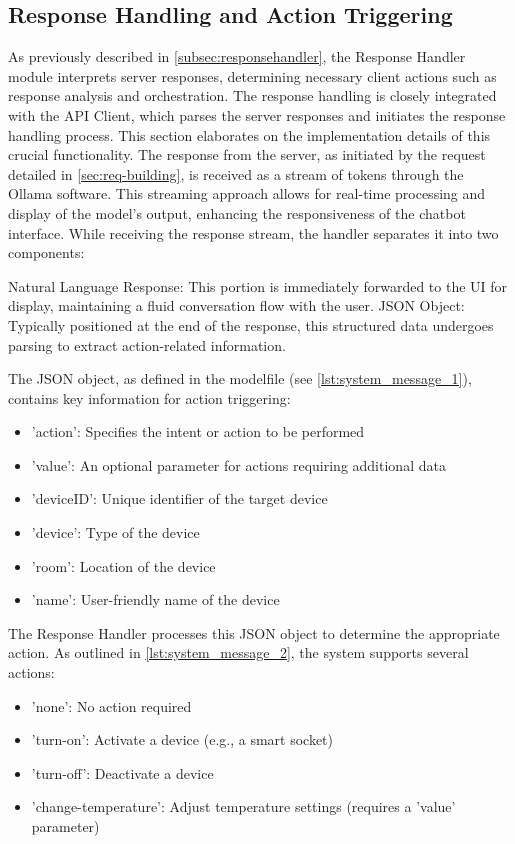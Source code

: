 \subsection{Response Handling and Action Triggering}
As previously described in \cref{subsec:responsehandler}, the Response Handler module interprets server responses, determining necessary client actions such as response analysis and orchestration. The response handling is closely integrated with the API Client, which parses the server responses and initiates the response handling process. This section elaborates on the implementation details of this crucial functionality.
The response from the server, as initiated by the request detailed in \cref{sec:req-building}, is received as a stream of tokens through the Ollama software. This streaming approach allows for real-time processing and display of the model's output, enhancing the responsiveness of the chatbot interface.
While receiving the response stream, the handler separates it into two components:

Natural Language Response: This portion is immediately forwarded to the UI for display, maintaining a fluid conversation flow with the user.
JSON Object: Typically positioned at the end of the response, this structured data undergoes parsing to extract action-related information.

The JSON object, as defined in the modelfile (see \cref{lst:system_message_1}), contains key information for action triggering:

\begin{itemize}
\item 'action': Specifies the intent or action to be performed
\item 'value': An optional parameter for actions requiring additional data
\item 'deviceID': Unique identifier of the target device
\item 'device': Type of the device
\item 'room': Location of the device
\item 'name': User-friendly name of the device
\end{itemize}

The Response Handler processes this JSON object to determine the appropriate action. As outlined in \cref{lst:system_message_2}, the system supports several actions:

\begin{itemize}
\item 'none': No action required
\item 'turn-on': Activate a device (e.g., a smart socket)
\item 'turn-off': Deactivate a device
\item 'change-temperature': Adjust temperature settings (requires a 'value' parameter)
\end{itemize}

